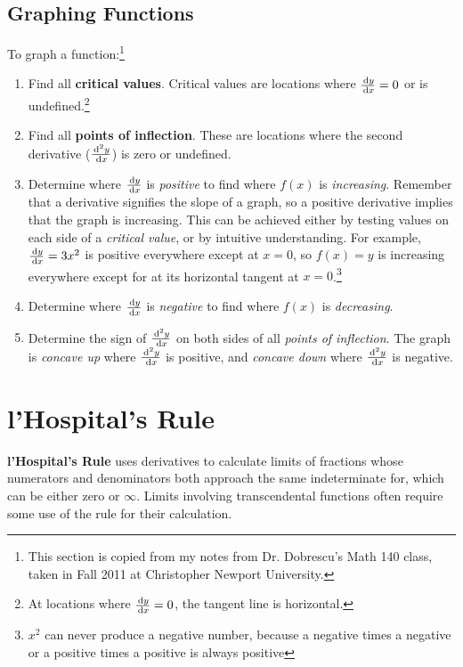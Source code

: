 \subsection{Graphing Functions}
To graph a function:\footnote{This section is copied from my notes from Dr. Dobrescu's Math 140 class, taken in Fall 2011 at Christopher Newport University.}
  \begin{enumerate}
   \item Find all \textbf{critical values}. Critical values are locations where $\frac{\,\mathrm{d} y}{\,\mathrm{d} x}=0$ or is undefined.\footnote{At locations where $\frac{\,\mathrm{d} y}{\,\mathrm{d} x}=0$, the tangent line is horizontal.}
   \item Find all \textbf{points of inflection}. These are locations where the second derivative ($\frac{\,\mathrm{d}^2y}{\,\mathrm{d} x}$) is zero or undefined.
   \item Determine where $\frac{\,\mathrm{d} y}{\,\mathrm{d} x}$ is \emph{positive} to find where $f(x)$ is \emph{increasing}. Remember that a derivative signifies the slope of a graph, so a positive derivative implies that the graph is increasing. This can be achieved either by testing values on each side of a \emph{critical value}, or by intuitive understanding. For example, $\frac{\,\mathrm{d} y}{\,\mathrm{d} x}=3x^2$ is positive everywhere except at $x=0$, so $f(x)=y$ is increasing everywhere except for at its horizontal tangent at $x=0$.\footnote{$x^2$ can never produce a negative number, because a negative times a negative or a positive times a positive is always positive}
   \item Determine where $\frac{\,\mathrm{d} y}{\,\mathrm{d} x}$ is \emph{negative} to find where $f(x)$ is \emph{decreasing}.
   \item Determine the sign of $\frac{\,\mathrm{d}^2y}{\,\mathrm{d} x}$ on both sides of all \emph{points of inflection}. The graph is \emph{concave up} where $\frac{\,\mathrm{d}^2y}{\,\mathrm{d} x}$ is positive, and \emph{concave down} where $\frac{\,\mathrm{d}^2y}{\,\mathrm{d} x}$ is negative.
  \end{enumerate}

\section{l'Hospital's Rule}\label{sec:lhospital}

\textbf{l'Hospital's Rule} uses derivatives to calculate limits of fractions whose numerators and denominators both approach the same indeterminate for, which can be either zero or $\infty$. Limits involving transcendental functions often require some use of the rule for their calculation.

